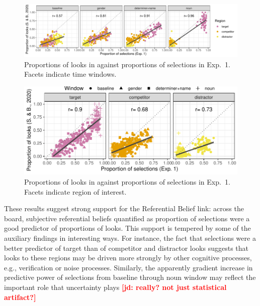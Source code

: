 \documentclass[10pt,letterpaper]{article}
\newcommand{\expref}[1]{Exp.~#1}
\newcommand{\jd}[1]{\textcolor{Red}{\textbf{[jd: #1]}}}
\begin{document}
\begin{figure}
\centering
\includegraphics[width=.9\textwidth]{../../analysis/SunBreheny/1_incremental/main/graphs/corr-window}
\caption{Proportions of looks in  against proportions of selections in \expref{1}. Facets indicate time windows.} 
\label{fig:corr-window}
\end{figure}


\begin{figure}
\centering
\includegraphics[width=\columnwidth]{../../analysis/SunBreheny/1_incremental/main/graphs/corr-region}
\caption{Proportions of looks in  against proportions of selections in \expref{1}. Facets indicate region of interest.} 
\label{fig:corr-region}
\end{figure}


These results suggest strong support for the Referential Belief link: across the board, subjective referential beliefs quantified as proportion of selections were a good predictor of proportions of looks. This support is tempered by some of the auxiliary findings in interesting ways. For instance, the fact that selections were a better predictor of target than of competitor and distractor looks suggests that looks to these regions may be driven more strongly by other cognitive processes, e.g.,  verification or noise processes. Similarly, the apparently gradient increase in predictive power of selections from baseline through noun window may reflect the important role that uncertainty plays \jd{really? not just statistical artifact?} 
\end{document}
